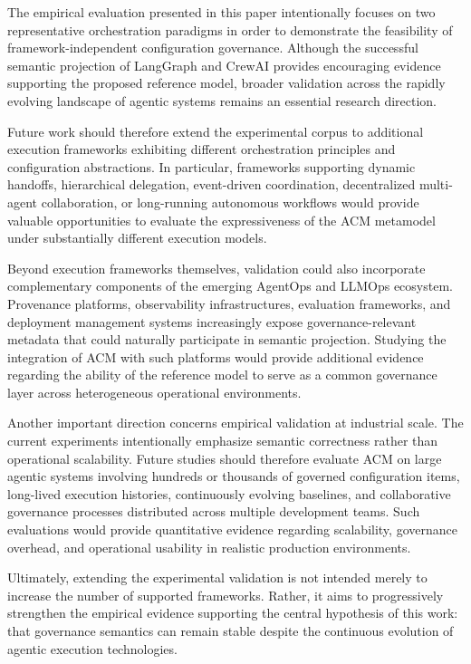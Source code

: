 \documentclass[10pt]{article}
\begin{document}
The empirical evaluation presented in this paper intentionally focuses on two representative orchestration paradigms in order to demonstrate the feasibility of framework-independent configuration governance. Although the successful semantic projection of LangGraph and CrewAI provides encouraging evidence supporting the proposed reference model, broader validation across the rapidly evolving landscape of agentic systems remains an essential research direction.

Future work should therefore extend the experimental corpus to additional execution frameworks exhibiting different orchestration principles and configuration abstractions. In particular, frameworks supporting dynamic handoffs, hierarchical delegation, event-driven coordination, decentralized multi-agent collaboration, or long-running autonomous workflows would provide valuable opportunities to evaluate the expressiveness of the ACM metamodel under substantially different execution models.

Beyond execution frameworks themselves, validation could also incorporate complementary components of the emerging AgentOps and LLMOps ecosystem. Provenance platforms, observability infrastructures, evaluation frameworks, and deployment management systems increasingly expose governance-relevant metadata that could naturally participate in semantic projection. Studying the integration of ACM with such platforms would provide additional evidence regarding the ability of the reference model to serve as a common governance layer across heterogeneous operational environments.

Another important direction concerns empirical validation at industrial scale. The current experiments intentionally emphasize semantic correctness rather than operational scalability. Future studies should therefore evaluate ACM on large agentic systems involving hundreds or thousands of governed configuration items, long-lived execution histories, continuously evolving baselines, and collaborative governance processes distributed across multiple development teams. Such evaluations would provide quantitative evidence regarding scalability, governance overhead, and operational usability in realistic production environments.

Ultimately, extending the experimental validation is not intended merely to increase the number of supported frameworks. Rather, it aims to progressively strengthen the empirical evidence supporting the central hypothesis of this work: that governance semantics can remain stable despite the continuous evolution of agentic execution technologies.
\end{document}
